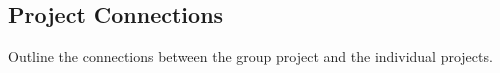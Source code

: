 \subsection{Project Connections}

Outline the connections between the group project and the individual projects.